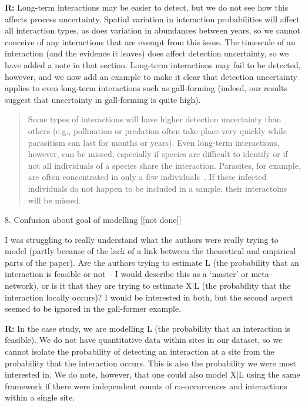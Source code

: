 \documentclass[12pt]{letter}
\newenvironment{refquote}{\bigskip \begin{it}}{\end{it}\smallskip}
\begin{document}
		\textbf{R:} Long-term interactions may be easier to detect, but we do not see how this affects process uncertainty. Spatial variation in interaction probabilities will affect all interaction types, as does variation in abundances between years, so we cannot conceive of any interactions that are exempt from this issue. The timescale of an interaction (and the evidence it leaves) does affect detection uncertainty, so we have added a note in that section. Long-term interactions may fail to be detected, however, and we now add an example to make it clear that detection uncertainty applies to even long-term interactions such as gall-forming (indeed, our results suggest that uncertainty in gall-forming is quite high).

			\begin{quotation}

				Some types of interactions will have higher detection uncertainty than others (e.g., pollination or predation often take place very quickly while parasitism can last for months or years). Even long-term interactions, however, can be missed, especially if species are difficult to identify or if not all individuals of a species share the interaction. Parasites, for example, are often concentrated in only a few individuals~\citep{Lagrue2017}. If these infected individuals do not happen to be included in a sample, their interactoins will be missed.

			\end{quotation}


	8. Confusion about goal of modelling [[not done]]

		\begin{refquote}
		I was struggling to really understand what the authors were really trying to model (partly because of the lack of a link between the theoretical and empirical parts of the paper). Are the authors trying to estimate L (the probability that an interaction is feasible or not – I would describe this as a ‘master’ or meta- network), or is it that they are trying to estimate X|L (the probability that the interaction locally occurs)? I would be interested in both, but the second aspect seemed to be ignored in the gall-former example.
		\end{refquote}

		\textbf{R:} In the case study, we are modelling L (the probability that an interaction is feasible). We do not have quantitative data within sites in our dataset, so we cannot isolate the probability of detecting an interaction at a site from the probability that the interaction occurs. This is also the probability we were most interested in. We do note, however, that one could also model X|L using the same framework if there were independent counts of co-occurrences and interactions within a single site. 
\end{document}

